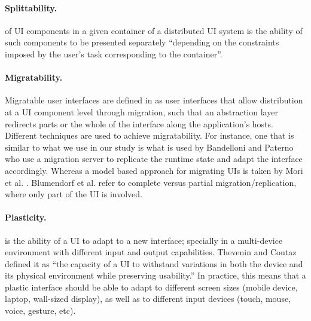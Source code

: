\paragraph{Splittability.} of UI components in a given container of a
distributed UI system is the ability of such components to be presented
separately ``depending on the constraints imposed by the user’s task corresponding to the container''.\cite{demeure20084c}
\paragraph{Migratability.} Migratable user interfaces are defined in
\cite{elmqvist2011distributed} as user interfaces that allow distribution at a
UI component level through migration, such that an abstraction layer redirects parts or the whole of the interface
along the application's hosts. Different techniques are used to achieve
migratability. For instance, one that is similar to what we use in our study is
what is used by Bandelloni and Paterno \cite{bandelloni2004flexible} who use a
migration server to replicate the runtime state and adapt the interface accordingly. Whereas a model based
approach for migrating UIs is taken by Mori et al. \cite{mori2004design}.
Blumendorf et al. \cite{blumendorf2011distributed} refer to complete versus
partial migration/replication, where only part of the UI is involved.
\paragraph{Plasticity.} is the ability of a UI to
adapt to a new interface; specially in a multi-device environment with
different input and output capabilities. Thevenin and Coutaz \cite{thevenin1999plasticity} defined
it as ``the capacity of a UI to withstand variations in both the device and its physical environment while preserving usability.'' In practice, this means that a plastic interface should be able to adapt to different screen sizes (mobile device, laptop, wall-sized display), as well as to different input devices (touch, mouse, voice, gesture, etc).

